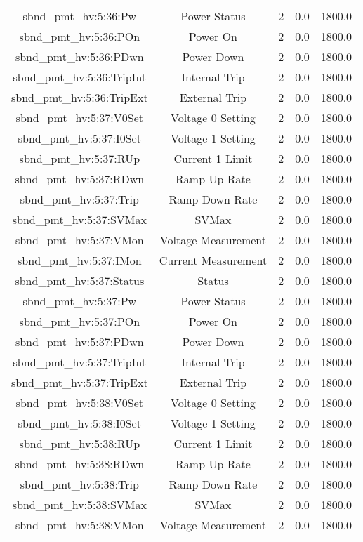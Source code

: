 \begin{table}[ptb]
\begin{tabular}{c | c c c c}
sbnd_pmt_hv:5:36:Pw & Power Status & 2 & 0.0 & 1800.0\\ 
sbnd_pmt_hv:5:36:POn & Power On & 2 & 0.0 & 1800.0\\ 
sbnd_pmt_hv:5:36:PDwn & Power Down & 2 & 0.0 & 1800.0\\ 
sbnd_pmt_hv:5:36:TripInt & Internal Trip & 2 & 0.0 & 1800.0\\ 
sbnd_pmt_hv:5:36:TripExt & External Trip & 2 & 0.0 & 1800.0\\ 
sbnd_pmt_hv:5:37:V0Set & Voltage 0 Setting & 2 & 0.0 & 1800.0\\ 
sbnd_pmt_hv:5:37:I0Set & Voltage 1 Setting & 2 & 0.0 & 1800.0\\ 
sbnd_pmt_hv:5:37:RUp & Current 1 Limit & 2 & 0.0 & 1800.0\\ 
sbnd_pmt_hv:5:37:RDwn & Ramp Up Rate & 2 & 0.0 & 1800.0\\ 
sbnd_pmt_hv:5:37:Trip & Ramp Down Rate & 2 & 0.0 & 1800.0\\ 
sbnd_pmt_hv:5:37:SVMax & SVMax & 2 & 0.0 & 1800.0\\ 
sbnd_pmt_hv:5:37:VMon & Voltage Measurement & 2 & 0.0 & 1800.0\\ 
sbnd_pmt_hv:5:37:IMon & Current Measurement & 2 & 0.0 & 1800.0\\ 
sbnd_pmt_hv:5:37:Status & Status & 2 & 0.0 & 1800.0\\ 
sbnd_pmt_hv:5:37:Pw & Power Status & 2 & 0.0 & 1800.0\\ 
sbnd_pmt_hv:5:37:POn & Power On & 2 & 0.0 & 1800.0\\ 
sbnd_pmt_hv:5:37:PDwn & Power Down & 2 & 0.0 & 1800.0\\ 
sbnd_pmt_hv:5:37:TripInt & Internal Trip & 2 & 0.0 & 1800.0\\ 
sbnd_pmt_hv:5:37:TripExt & External Trip & 2 & 0.0 & 1800.0\\ 
sbnd_pmt_hv:5:38:V0Set & Voltage 0 Setting & 2 & 0.0 & 1800.0\\ 
sbnd_pmt_hv:5:38:I0Set & Voltage 1 Setting & 2 & 0.0 & 1800.0\\ 
sbnd_pmt_hv:5:38:RUp & Current 1 Limit & 2 & 0.0 & 1800.0\\ 
sbnd_pmt_hv:5:38:RDwn & Ramp Up Rate & 2 & 0.0 & 1800.0\\ 
sbnd_pmt_hv:5:38:Trip & Ramp Down Rate & 2 & 0.0 & 1800.0\\ 
sbnd_pmt_hv:5:38:SVMax & SVMax & 2 & 0.0 & 1800.0\\ 
sbnd_pmt_hv:5:38:VMon & Voltage Measurement & 2 & 0.0 & 1800.0\\ 

\end{tabular}
\end{table}
